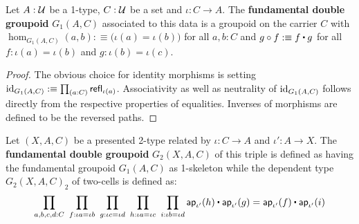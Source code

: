 \begin{defn} Let $A : \mathcal{U}$ be a 1-type, $C : \mathcal{U}$ be a set
and $\iota : C \to A$. The \textbf{fundamental double groupoid} $G_1(A,C)$ 
associated to this data is a groupoid on the carrier $C$ with
$\hom_{G_1(A,C)}(a,b) :\equiv \big(\iota(a) = \iota(b)\big)$ for all $a,b:C$ and
$g \circ f :\equiv f \ct g$ for all $f : \iota(a) = \iota(b)$ and $g : \iota(b)
= \iota(c)$.
\end{defn}

\begin{proof}
The obvious choice for identity morphisms is setting $\operatorname{id}_{G_1(A,C)} :\equiv
\prod_{(a:C)} \mathsf{refl}_{\iota(a)}$. Associativity as well as neutrality of $\operatorname{id}_{G_1(A,C)}$
follows directly from the respective properties of equalities. %
Inverses of morphisms are defined to be the reversed paths.
\end{proof}

\begin{defn} \label{def:fundamental-dbl-gpd}
Let $(X,A,C)$ be a presented 2-type related by $\iota : C \to A$ and $\iota' :
A \to X$. The \textbf{fundamental double groupoid} $G_2(X,A,C)$ of this triple
is defined as having the fundamental groupoid $G_1(A,C)$ as 1-skeleton while the
dependent type $G_2(X,A,C)_2$ of two-cells is defined as:
\begin{equation}
\prod_{a,b,c,d:C} ~ \prod_{f : \iota a = \iota b} ~ \prod_{g : \iota c = \iota d}
	~ \prod_{h : \iota a = \iota c} ~ \prod_{i : \iota b = \iota d}
	\apiop(h) \ct \apiop(g) = \apiop(f) \ct \apiop(i)
\end{equation}
\end{defn}

